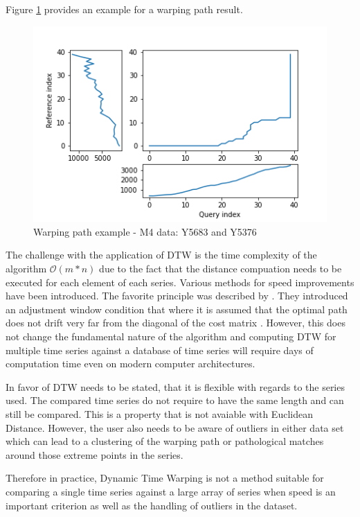 \documentclass[phd,black, hidelinks]{PrincetonThesis}
\begin{document}
Figure \ref{fig:org232cb5e} provides an example for a warping path result.

\begin{figure}[htbp]
\centering
\includegraphics[width=.9\linewidth]{./img/dtw_3way.png}
\caption{\label{fig:org232cb5e}Warping path example - M4 data: Y5683 and Y5376}
\end{figure}

The challenge with the application of DTW is the time complexity of the algorithm \(\mathcal{O}(m*n)\) due to the fact that the distance compuation needs to be executed for each element of each series. Various methods for speed improvements have been introduced. The favorite principle was described by \citeauthor{Ratanamahatana_2004}. They introduced an adjustment window condition that where it is assumed that the optimal path does not drift very far from the diagonal of the cost matrix \cite{Ratanamahatana_2004}. However, this does not change the fundamental nature of the algorithm and computing DTW for multiple time series against a database of time series will require days of computation time even on modern computer architectures. 

In favor of DTW needs to be stated, that it is flexible with regards to the series used. The compared time series do not require to have the same length and can still be compared. This is a property that is not avaiable with Euclidean Distance. However, the user also needs to be aware of outliers in either data set which can lead to a clustering of the warping path or pathological matches around those extreme points in the series. 

Therefore in practice, Dynamic Time Warping is not a method suitable for comparing a single time series against a large array of series when speed is an important criterion as well as the handling of outliers in the dataset.
\end{document}
